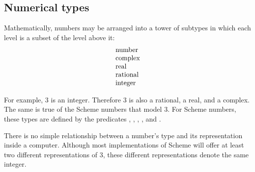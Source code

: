 
\subsection{Numerical types}
\label{numericaltypes}



\vest Mathematically, numbers may be arranged into a tower of subtypes
in which each level is a subset of the level above it:
$$\begin{tabular}{l}
\tupe{number} \\
\tupe{complex} \\
\tupe{real} \\
\tupe{rational} \\
\tupe{integer} 
\end{tabular} $$

For example, 3 is an integer.  Therefore 3 is also a rational,
a real, and a complex.  The same is true of the Scheme numbers
that model 3.  For Scheme numbers, these types are defined by the
predicates , , , ,
and .

There is no simple relationship between a number's type and its
representation inside a computer.  Although most implementations of
Scheme will offer at least two different representations of 3, these
different representations denote the same integer.


